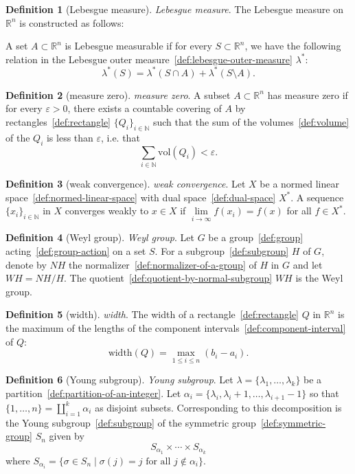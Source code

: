 \documentclass[12pt,a4paper]{article}
\theoremstyle{definition}
\newtheorem{definition}{Definition}
\begin{document}
\begin{definition}[Lebesgue measure]\label{def:lebesgue-measure}
\emph{Lebesgue measure}. The Lebesgue measure on $\mathbb R^n$ is constructed as follows: 

A set $A \subset\mathbb R^n$ is Lebesgue measurable if for every $S\subset \mathbb R^n$, we have the following relation in the Lebesgue outer measure~\ref{def:lebesgue-outer-measure} $\lambda^*$: $$\lambda^*(S) = \lambda^*(S\cap A) + \lambda^*(S\setminus A).$$
\end{definition}

\begin{definition}[measure zero]\label{def:measure-zero}
\emph{measure zero}. A subset $A \subset\mathbb R^n$ has measure zero if for every $\varepsilon > 0$, there exists a countable covering of $A$ by rectangles~\ref{def:rectangle} $\{Q_i\}_{i\in\mathbb N}$ such that the sum of the volumes~\ref{def:volume} of the $Q_i$ is less than $\varepsilon$, i.e. that $$\sum_{i\in\mathbb N} \text{vol}(Q_i) < \varepsilon.$$
\end{definition}

\begin{definition}[weak convergence]\label{def:weak-convergence}
\emph{weak convergence}. Let $X$ be a normed linear space~\ref{def:normed-linear-space} with dual space~\ref{def:dual-space} $X^*$. A sequence $\{x_i\}_{i\in\mathbb N}$ in $X$ converges weakly to $x \in X$ if $\lim\limits_{i\to\infty} f(x_i)=f(x)$ for all $f\in X^*$.
\end{definition}

\begin{definition}[Weyl group]\label{def:weyl-group}
\emph{Weyl group}. Let $G$ be a group~\ref{def:group} acting~\ref{def:group-action} on a set $S$. For a subgroup~\ref{def:subgroup} $H$ of $G$, denote by $NH$ the normalizer~\ref{def:normalizer-of-a-group} of $H$ in $G$ and let $WH = NH/H$. The quotient~\ref{def:quotient-by-normal-subgroup} $WH$ is the  Weyl group.
\end{definition}

\begin{definition}[width]\label{def:width}
\emph{width}. The width of a rectangle~\ref{def:rectangle} $Q$ in $\mathbb R^n$ is the maximum of the lengths of the component intervals~\ref{def:component-interval} of $Q$: $$\text{width}(Q)= \max_{1\leq i \leq n} (b_i-a_i).$$
\end{definition}

\begin{definition}[Young subgroup]\label{def:young-subgroup}
\emph{Young subgroup}. Let $\lambda = \{\lambda_1,\dots,\lambda_k\}$ be a partition~\ref{def:partition-of-an-integer}. Let $\alpha_i = \{\lambda_i, \lambda_i + 1, \dots, \lambda_{i+1} - 1\}$ so that $\{1,\dots,n\} = \coprod_{i=1}^k \alpha_i$ as disjoint subsets. Corresponding to this decomposition is the Young subgroup~\ref{def:subgroup} of the symmetric group~\ref{def:symmetric-group} $S_n$ given by $$S_{\alpha_1} \times \cdots \times S_{\alpha_k}$$ where $S_{\alpha_i} = \{\sigma\in S_n \mid \sigma(j) = j \text{ for all } j\notin \alpha_i\}$.
\end{definition}
\end{document}
